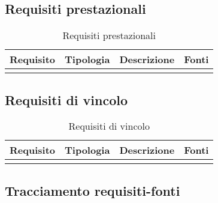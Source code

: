 \subsection{ Requisiti prestazionali}
	
\begin{longtable}{|l|p{2.5cm}|p{5cm}|p{3.5cm}|}
\hline
\textbf{Requisito} & \textbf{Tipologia} & \textbf{Descrizione} & \textbf{Fonti} \\
\hline
\caption{Requisiti prestazionali}
\end{longtable}
\subsection{ Requisiti di vincolo}
	
\begin{longtable}{|l|p{2.5cm}|p{5cm}|p{3.5cm}|}
\hline
\textbf{Requisito} & \textbf{Tipologia} & \textbf{Descrizione} & \textbf{Fonti} \\
\hline
\caption{Requisiti di vincolo}
\end{longtable}
\subsection{ Tracciamento requisiti-fonti}
	
